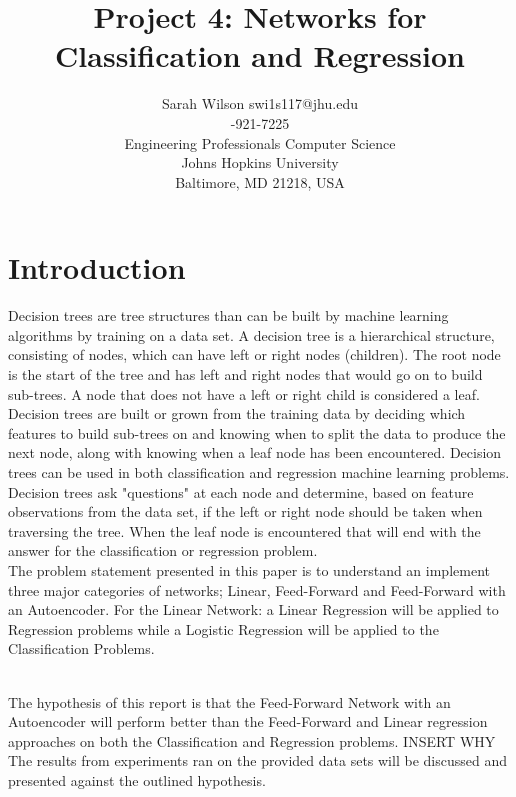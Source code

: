 \documentclass[twoside,11pt]{article}
\begin{document}
\title{Project 4: Networks for Classification and Regression}

\author{\name Sarah Wilson 
	   \email swi1s117@jhu.edu \\
	   -921-7225 \\
       \addr Engineering Professionals Computer Science\\
       Johns Hopkins University\\
       Baltimore, MD 21218, USA} 

\maketitle


\section{Introduction}
\hspace*{10mm} Decision trees are tree structures than can be built by machine learning algorithms by training on a data set. A decision tree is a hierarchical structure, consisting of nodes, which can have left or right nodes (children). The root node is the start of the tree and has left and right nodes that would go on to build sub-trees. A node that does not have a left or right child is considered a leaf. Decision trees are built or grown from the training data by deciding which features to build sub-trees on and knowing when to split the data to produce the next node, along with knowing when a leaf node has been encountered. Decision trees can be used in both classification and regression machine learning problems. Decision trees ask "questions" at each node and determine, based on feature observations from the data set, if the left or right node should be taken when traversing the tree. When the leaf node is encountered that will end with the answer for the classification or regression problem.\\ 

\hspace*{5mm} The problem statement presented in this paper is to understand an implement three major categories of networks; Linear, Feed-Forward and  Feed-Forward with an Autoencoder. For the Linear Network: a Linear Regression will be applied to Regression problems while a Logistic Regression will be applied to the Classification Problems.

\\

\hspace*{5mm} The hypothesis of this report is that the  Feed-Forward Network with an Autoencoder will perform better than the Feed-Forward and Linear regression approaches on both the Classification and Regression problems.
INSERT WHY
The results from experiments ran on the provided data sets will be discussed and presented against the outlined hypothesis.
\end{document}
